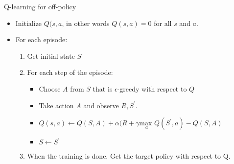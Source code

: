 \begin{wbox}{Q-learning for off-policy}
\begin{itemize}
	\item Initialize $Q(s,a$, in other words $Q(s,a) = 0$ for all $s$ and $a$.
	\item For each episode:
	\begin{enumerate}
		\item Get initial state $S$
		\item For each step of the episode:
			\begin{itemize}
				\item Choose $A$ from $S$ that is $\epsilon$-greedy with respect to $Q$
				\item Take action $A$ and observe $R,S^{\prime}$.
				\item $Q(s,a) \leftarrow Q(S,A) + \alpha(R + \gamma \underset{a}{\text{max }}Q(S^{\prime},a) -Q(S,A)$
				\item $S \leftarrow S^{\prime}$
			\end{itemize}
		\item When the training is done. Get the target policy with respect to Q.
	\end{enumerate}
\end{itemize}
\end{wbox}



























